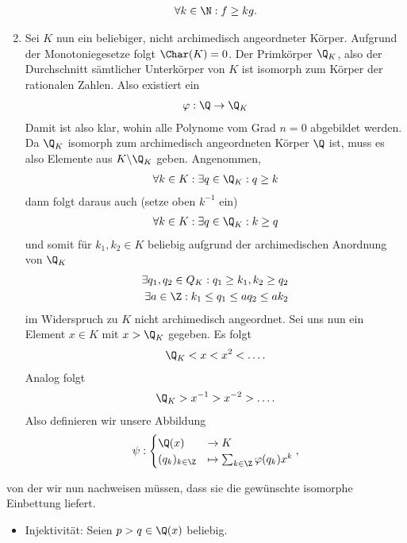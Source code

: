 \begin{solution}
\begin{enumerate}
  \begin{align*}
    \forall k \in \N: f \geq kg.
  \end{align*}
  \item Sei $K$ nun ein beliebiger, nicht archimedisch angeordneter Körper.
  Aufgrund der Monotoniegesetze folgt $\Char(K) = 0$.
  Der Primkörper $\Q_K$, also der Durchschnitt sämtlicher Unterkörper von $K$
  ist isomorph zum Körper der rationalen Zahlen. Also existiert ein
  \begin{align*}
    \varphi: \Q \to \Q_K
  \end{align*}
  Damit ist also klar, wohin
  alle Polynome vom Grad $n = 0$ abgebildet werden.
  Da $\Q_K$ isomorph zum archimedisch angeordneten Körper $\Q$ ist,
  muss es also Elemente aus $K \backslash \Q_K$ geben.
  Angenommen,
  \begin{align*}
    \forall k \in K: \exists q \in \Q_K: q \geq k
  \end{align*}
  dann folgt daraus auch (setze oben $k^{-1}$ ein)
  \begin{align*}
    \forall k \in K: \exists q \in \Q_K: k \geq q
  \end{align*}
  und somit für $k_1, k_2 \in K$ beliebig aufgrund der archimedischen Anordnung von $\Q_K$
  \begin{align*}
    \exists q_1,q_2 \in Q_K: q_1 \geq k_1, k_2 \geq q_2 \\
    \exists a \in \Z: k_1 \leq q_1 \leq aq_2 \leq ak_2
  \end{align*}
  im Widerspruch zu $K$ nicht archimedisch angeordnet.
  Sei uns nun ein Element $x \in K$ mit $x > \Q_K$ gegeben. Es folgt
  \begin{align*}
    \Q_K < x < x^2 < \dots.
  \end{align*}
  Analog folgt
  \begin{align*}
    \Q_K > x^{-1} > x^{-2} > \dots.
  \end{align*}
  Also definieren wir unsere Abbildung
  \begin{align*}
    \psi: \begin{cases}
      \Q(x) &\to K \\
      (q_k)_{k \in \Z} &\mapsto
        \sum_{k \in \Z}\varphi(q_k)x^k
    \end{cases},
  \end{align*}
\end{enumerate}
von der wir nun nachweisen müssen, dass sie die gewünschte isomorphe Einbettung liefert.
\begin{itemize}
  \item Injektivität: Seien $p > q \in \Q(x)$ beliebig. \\

\end{itemize}
\end{solution}
